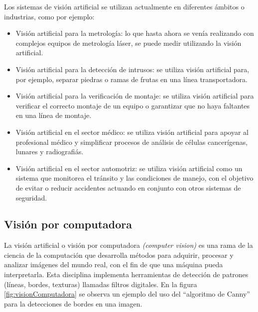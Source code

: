 
\newpage

Los sistemas de visión artificial se utilizan actualmente en diferentes ámbitos o industrias, como por ejemplo:
\begin{itemize}
\item Visión artificial para la metrología: lo que hasta ahora se venía realizando con complejos equipos de metrología láser, se puede medir utilizando la visión artificial.
\item Visión artificial para la detección de intrusos: se utiliza visión artificial para, por ejemplo, separar piedras o ramas de frutas en una línea transportadora.
\item Visión artificial para la verificación de montaje: se utiliza visión artificial para verificar el correcto montaje de un equipo o garantizar que no haya faltantes en una línea de montaje.
\item Visión artificial en el sector médico: se utiliza visión artificial para apoyar al profesional médico y simplificar procesos de análisis de células cancerígenas, lunares y radiografiás.
\item Visión artificial en el sector automotriz: se utiliza visión artificial como un sistema que monitorea el tránsito y las condiciones de manejo, con el objetivo de evitar o reducir accidentes actuando en conjunto con otros sistemas de seguridad.
\end{itemize}

\subsection{Visión por computadora}

La visión artificial o visión por computadora \textit{(computer vision)} \citep{COMPUTER_VISION} es una rama de la ciencia de la computación que desarrolla métodos para adquirir, procesar y analizar imágenes del mundo real, con el fin de que una máquina pueda interpretarla. Esta disciplina implementa herramientas de detección de patrones (líneas, bordes, texturas) llamadas filtros digitales. En la figura \ref{fig:visionComputadora} se observa un ejemplo del uso del ``algoritmo de Canny'' para la detecciones de bordes en una imagen.

